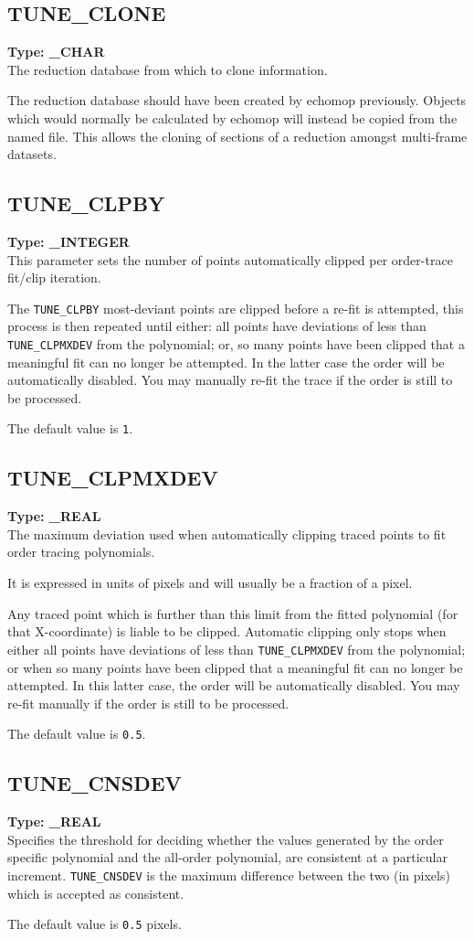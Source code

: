 \documentclass[11pt,twoside]{article}
\makeatletter
\newcommand{\htmlref}[2]{#1}
\newcommand{\xlabel}[1]{}
\newcommand{\indexcmdname}[1]{\index{#1@\protect\cmdname{#1}}}
\renewcommand{\indexcmdname}[1]{}
\newcommand{\cmdname}{\begingroup \catcode`\_=12 \realcmdname}
\newcommand{\realcmdname}[1]{\endgroup\texttt{#1}}
\newcommand{\echparameter}[4]
{
\item [#1 = #3] \mbox{}\label{par_#2}\indexcmdname{#2}
\\
#4
}
\renewcommand{\echparameter}[4]
{
  \subsection{\xlabel{par_#2}\label{par_#2}{\bf #1}}
  {\bf Type: #3}\\
#4
}
\makeatother
\begin{document}
\echparameter{TUNE\_CLONE}{TUNE_CLONE}{
 \_CHAR
}{
 The reduction database from which to clone information.

 The reduction database should have been created by {\sc echomop}
 previously.  Objects which would normally be calculated by {\sc echomop}
 will instead be copied from the named file.  This allows the cloning
 of sections of a reduction amongst multi-frame datasets.
}

\echparameter{TUNE\_CLPBY}{TUNE_CLPBY}{
 \_INTEGER
}{
 This parameter sets the number of points automatically clipped
 per order-trace fit/clip iteration.

 The {\tt TUNE\_CLPBY} most-deviant points are clipped before
 a re-fit is  attempted, this process is then repeated until either:
 all points have deviations of less than
 \htmlref{{\tt TUNE\_CLPMXDEV}}{par_TUNE_CLPMXDEV} from the
 polynomial; or, so many points have been clipped that a meaningful fit
 can no longer be attempted.
 In the latter case the order will be automatically disabled.
 You may manually re-fit the trace if the order is still
 to be processed.

 The default value is \texttt{1}.
}

\echparameter{TUNE\_CLPMXDEV}{TUNE_CLPMXDEV}{
 \_REAL
}{
 The maximum deviation used when automatically clipping traced
 points to fit order tracing polynomials.

 It is expressed in units of pixels and will usually be a fraction
 of a pixel.

 Any traced point which is further than this limit from the fitted
 polynomial (for that X-coordinate) is liable to be clipped.  Automatic
 clipping only stops when either all points have deviations of less than
 {\tt TUNE\_CLPMXDEV} from the polynomial; or when so many points have been
 clipped that a meaningful fit can no longer be attempted.  In this
 latter case, the order will be automatically disabled.  You may
 re-fit manually if the order is still to be processed.

 The default value is \texttt{0.5}.
}

\echparameter{TUNE\_CNSDEV}{TUNE_CNSDEV}{
 \_REAL
}{
 Specifies the threshold for deciding whether the values generated
 by the order specific polynomial and the all-order polynomial, are
 consistent at a particular increment. {\tt TUNE\_CNSDEV} is the maximum
 difference between the two (in pixels) which is accepted as
 consistent.

 The default value is \texttt{0.5} pixels.
}
\end{document}
